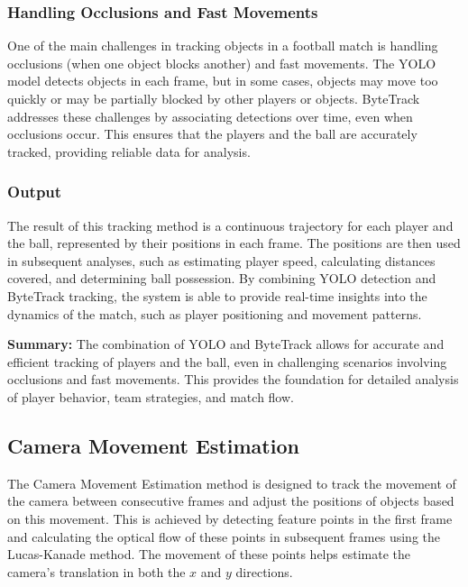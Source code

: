 \subsubsection{Handling Occlusions and Fast Movements}
One of the main challenges in tracking objects in a football match is handling occlusions (when one object blocks another) and fast movements. The YOLO model detects objects in each frame, but in some cases, objects may move too quickly or may be partially blocked by other players or objects. ByteTrack addresses these challenges by associating detections over time, even when occlusions occur. This ensures that the players and the ball are accurately tracked, providing reliable data for analysis.

\subsubsection{Output}
The result of this tracking method is a continuous trajectory for each player and the ball, represented by their positions in each frame. The positions are then used in subsequent analyses, such as estimating player speed, calculating distances covered, and determining ball possession. By combining YOLO detection and ByteTrack tracking, the system is able to provide real-time insights into the dynamics of the match, such as player positioning and movement patterns.

\textbf{Summary:} The combination of YOLO and ByteTrack allows for accurate and efficient tracking of players and the ball, even in challenging scenarios involving occlusions and fast movements. This provides the foundation for detailed analysis of player behavior, team strategies, and match flow.


\subsection{Camera Movement Estimation}
The Camera Movement Estimation method is designed to track the movement of the camera between consecutive frames and adjust the positions of objects based on this movement. This is achieved by detecting feature points in the first frame and calculating the optical flow of these points in subsequent frames using the Lucas-Kanade method. The movement of these points helps estimate the camera's translation in both the $x$ and $y$ directions.


